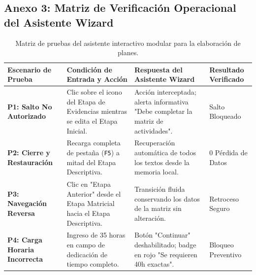 \documentclass[12pt,a4paper]{article}
\begin{document}
\subsection*{Anexo 3: Matriz de Verificación Operacional del Asistente Wizard}
\begin{table}[H]
\centering
\small
\renewcommand{\arraystretch}{1.15}
\begin{tabularx}{\textwidth}{|>{\hsize=0.75\hsize\raggedright\arraybackslash\bfseries\footnotesize}X|>{\hsize=1.25\hsize\raggedright\arraybackslash\footnotesize}X|>{\hsize=1.35\hsize\raggedright\arraybackslash\footnotesize}X|>{\hsize=0.65\hsize\centering\arraybackslash\footnotesize}X|}
\hline
\rowcolor{tableheader}
\textbf{Escenario de Prueba} & \textbf{Condición de Entrada y Acción} & \textbf{Respuesta del Asistente Wizard} & \textbf{Resultado Verificado} \\
\hline
P1: Salto No Autorizado & Clic sobre el icono del Etapa de Evidencias mientras se edita el Etapa Inicial. & Acción interceptada; alerta informativa "Debe completar la matriz de actividades". & Salto Bloqueado \\
\hline
P2: Cierre y Restauración & Recarga completa de pestaña (\texttt{F5}) a mitad del Etapa Descriptiva. & Recuperación automática de todos los textos desde la memoria local. & 0 Pérdida de Datos \\
\hline
P3: Navegación Reversa & Clic en "Etapa Anterior" desde el Etapa Matricial hacia el Etapa Descriptiva. & Transición fluida conservando los datos de la matriz sin alteración. & Retroceso Seguro \\
\hline
P4: Carga Horaria Incorrecta & Ingreso de 35 horas en campo de dedicación de tiempo completo. & Botón "Continuar" deshabilitado; badge en rojo "Se requieren 40h exactas". & Bloqueo Preventivo \\
\hline
\end{tabularx}
\caption{Matriz de pruebas del asistente interactivo modular para la elaboración de planes.}
\end{table}
\end{document}
